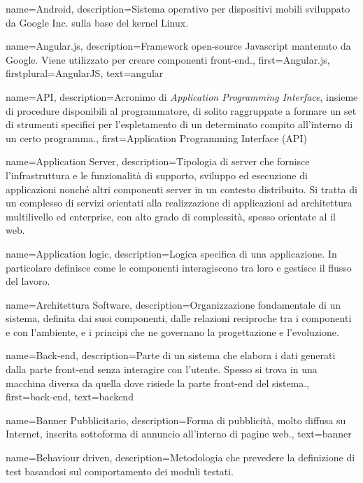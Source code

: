 {
name={Android},
description={Sistema operativo per dispositivi mobili sviluppato da Google Inc. sulla base del kernel Linux.}
}

{
name={Angular.js},
description={Framework open-source Javascript mantenuto da Google. Viene utilizzato per creare componenti front-end.},
first={Angular.js},
firstplural={AngularJS},
text={angular}
}

{
name={API},
description={Acronimo di \textit{Application Programming Interface}, insieme di procedure disponibili al programmatore, di solito raggruppate a formare un set di strumenti specifici per l'espletamento di un determinato compito all'interno di un certo programma.},
first={Application Programming Interface (API)}
}

{
name={Application Server},
description={Tipologia di server che fornisce l'infrastruttura e le funzionalità di supporto, sviluppo ed esecuzione di applicazioni nonché altri componenti server in un contesto distribuito. Si tratta di un complesso di servizi orientati alla realizzazione di applicazioni ad architettura multilivello ed enterprise, con alto grado di complessità, spesso orientate al il web.}
}

{
name={Application logic},
description={Logica specifica di una applicazione. In particolare definisce come le componenti interagiscono tra loro e gestisce il flusso del lavoro.}
}

{
name={Architettura Software},
description={Organizzazione fondamentale di un sistema, definita dai suoi componenti, dalle relazioni reciproche tra i componenti e con l'ambiente, e i principi che ne governano la progettazione e l'evoluzione.}
}

{
name={Back-end},
description={Parte di un sistema che elabora i dati generati dalla parte front-end senza interagire con l'utente. Spesso si trova in una macchina diversa da quella dove risiede la parte front-end del sistema.},
first={back-end},
text={backend}
}

{
name={Banner Pubblicitario},
description={Forma di pubblicità, molto diffusa su Internet, inserita sottoforma di annuncio all'interno di pagine web.},
text={banner}
}

{
name={Behaviour driven},
description={Metodologia che prevedere la definizione di test basandosi sul comportamento dei moduli testati.}
}

